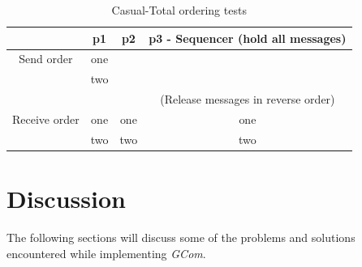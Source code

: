 \documentclass[titlepage, twocolumn, a4paper, 10pt]{article}
\begin{document}
\begin{table}[H]
  \centering
  \begin{footnotesize}
    \begin{tabular} {c | c | c | c}
      & p1 & p2 & p3 - Sequencer (hold all messages) \\
      \hline
      Send order & one &  &  \\
      & two &  &  \\
      \hline
      &  &  & (Release messages in reverse order) \\
      \hline
      Receive order & one & one & one \\
      & two & two & two \\
    \end{tabular}
  \end{footnotesize}
  \caption{Casual-Total ordering tests}
  \label{tbl:castot}
\end{table}

\section{Discussion}\label{sec:discussion}
The following sections will discuss some of the problems and solutions
encountered while implementing \textit{GCom}.

\end{document}
